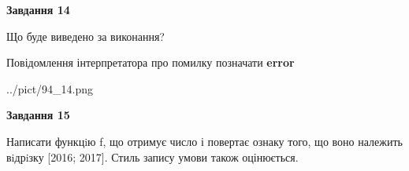 \documentclass[11pt, ukrainian]{article}
\begin{document}
{\begin {large}
{\begin {center}\textbf{Завдання 14}\end {center}}\par
Що буде виведено за виконання? \par
Повідомлення інтерпретатора про помилку позначати \textbf{error}

\begin{center}
	{../pict/94_14.png}
\end{center}
\newpage

{\begin {center}\textbf{Завдання 15}\end {center}}\par

Написати функцiю f, що отримує число і повертає ознаку того, що воно належить вiдрiзку [2016; 2017]. Стиль запису умови також оцінюється.\par
\newpage

\end {large}}
\end{document}
